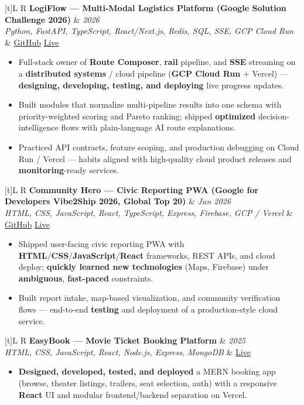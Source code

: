 \documentclass[a4paper,10pt]{article}
\newcommand{\resumeProject}[4]{%
  \vspace{0.5mm}
  \noindent
  \begin{tabularx}{\textwidth}[t]{L R}
    \textbf{#1} & \textit{#3} \\
    \textit{#2} & #4 \\
  \end{tabularx}
  \vspace{-0.2mm}%
}
\begin{document}
\resumeProject
  {LogiFlow --- Multi-Modal Logistics Platform (Google Solution Challenge 2026)}
  {Python, FastAPI, TypeScript, React/Next.js, Redis, SQL, SSE, GCP Cloud Run}
  {2026}
  {\href{https://github.com/KARANBHAI029/LOGIFLOW}{GitHub} \textbar{} \href{https://logi-flow-solution-challenge-2026.vercel.app/}{Live}}
\begin{itemize}
  \item Full-stack owner of \textbf{Route Composer}, \textbf{rail} pipeline, and \textbf{SSE} streaming on a \textbf{distributed systems} / cloud pipeline (\textbf{GCP Cloud Run} + Vercel) --- \textbf{designing, developing, testing, and deploying} live progress updates.
  \item Built modules that normalize multi-pipeline results into one schema with priority-weighted scoring and Pareto ranking; shipped \textbf{optimized} decision-intelligence flows with plain-language AI route explanations.
  \item Practiced API contracts, feature scoping, and production debugging on Cloud Run / Vercel --- habits aligned with high-quality cloud product releases and \textbf{monitoring}-ready services.
\end{itemize}

\resumeProject
  {Community Hero --- Civic Reporting PWA (Google for Developers Vibe2Ship 2026, Global Top 20)}
  {HTML, CSS, JavaScript, React, TypeScript, Express, Firebase, GCP / Vercel}
  {Jun 2026}
  {\href{https://github.com/Ojas-Srivastava05/community-hero}{GitHub} \textbar{} \href{https://community-hero-eight.vercel.app}{Live}}
\begin{itemize}
  \item Shipped user-facing civic reporting PWA with \textbf{HTML}/\textbf{CSS}/\textbf{JavaScript}/\textbf{React} frameworks, REST APIs, and cloud deploy; \textbf{quickly learned new technologies} (Maps, Firebase) under \textbf{ambiguous}, \textbf{fast-paced} constraints.
  \item Built report intake, map-based visualization, and community verification flows --- end-to-end \textbf{testing} and deployment of a production-style cloud service.
\end{itemize}

\resumeProject
  {EasyBook --- Movie Ticket Booking Platform}
  {HTML, CSS, JavaScript, React, Node.js, Express, MongoDB}
  {2025}
  {\href{https://easy-book-kappa.vercel.app/}{Live}}
\begin{itemize}
  \item \textbf{Designed, developed, tested, and deployed} a MERN booking app (browse, theater listings, trailers, seat selection, auth) with a responsive \textbf{React} UI and modular frontend/backend separation on Vercel.
\end{itemize}
\end{document}
